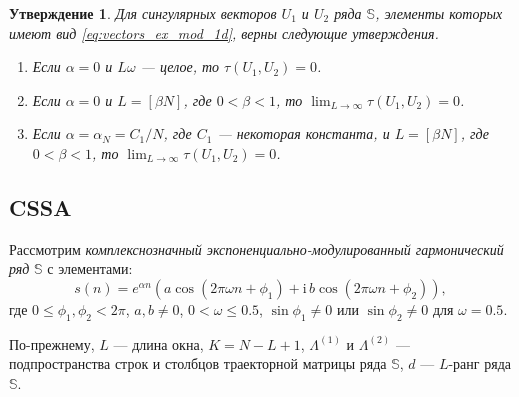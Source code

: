 \documentclass[specialist,
               substylefile = spbu.rtx,
               subf,href,colorlinks=true, 12pt]{disser}
\newcommand{\I}{\mathrm{i}}
\newtheorem{Th}{Утверждение}
\begin{document}
\begin{Th}  \cite[Теорема 1]{Zhornikova2016} \label{th:th_tau_1d}
Для сингулярных векторов $U_1$ и $U_2$  ряда $\mathbb{S}$, элементы которых имеют вид \eqref{eq:vectors_ex_mod_1d}, верны следующие утверждения.
\begin{enumerate}
\item \label{th:re_tau1}
Если $\alpha=0$ и $L\omega$ --- целое, то $\tau(U_1, U_2)=0$.
\item \label{th:re_tau2}
Если $\alpha = 0$ и  $L=[\beta N]$, где $0<\beta<1$, то $\lim_{L \rightarrow \infty}\tau(U_1, U_2) = 0$.
\item  \label{th:re_tau3}
Если $\alpha = \alpha_N = C_1/N$, где $C_1$ --- некоторая константа, и $L=[\beta N]$, где $0<\beta<1$, то $\lim_{L \rightarrow \infty}\tau(U_1, U_2) = 0$.
\end{enumerate}
\end{Th}

\subsection{CSSA}
\label{sec:cssa_theory}
Рассмотрим \textit{комплекснозначный экспоненциально-модулированный гармонический ряд} $\mathbb{S}$ с элементами:
\begin{equation} \label{eq:complex_exmodgarm}
 s(n) = e^{\alpha n} (a\cos(2\pi\omega n + \phi_1) + \I \,b\cos(2\pi\omega n + \phi_2)),
\end{equation}
где $0 \leqslant\phi_1, \phi_2 < 2\pi$, $a, b \not = 0$, $0<\omega \leqslant 0.5$, $\sin \phi_1 \not = 0$ или $\sin \phi_2 \not = 0$ для $\omega = 0.5$.

По-прежнему, $L$ --- длина окна, $K=N-L+1$, $\Lambda^{(1)}$ и $\Lambda^{(2)}$ --- подпространства строк и столбцов траекторной матрицы ряда $\mathbb{S}$, $d$ --- $L$-ранг ряда $\mathbb{S}$.
\end{document}
